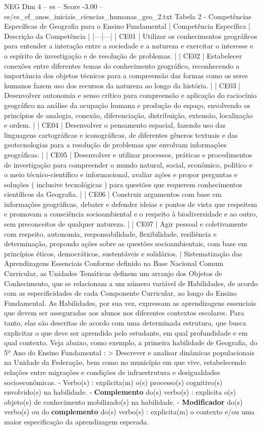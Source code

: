 \begin{textsample}{NEG Dim 4 – es – Score -3.00 – es/es\_ef\_anos\_iniciais\_ciencias\_humanas\_geo\_2.txt}
Tabela 2 - Competências Específicas de Geografia para o Ensino Fundamental | Competência Específica | Descrição da Competência | |---|---| | CE01 | Utilizar os conhecimentos geográficos para entender a interação entre a sociedade e a natureza e exercitar o interesse e o espírito de investigação e de resolução de problemas. | | CE02 | Estabelecer conexões entre diferentes temas do conhecimento geográfico, reconhecendo a importância dos objetos técnicos para a compreensão das formas como os seres humanos fazem uso dos recursos da natureza ao longo da história. | | CE03 | Desenvolver autonomia e senso crítico para compreensão e aplicação do raciocínio geográfico na análise da ocupação humana e produção do espaço, envolvendo os princípios de analogia, conexão, diferenciação, distribuição, extensão, localização e ordem. | | CE04 | Desenvolver o pensamento espacial, fazendo uso das linguagens cartográficas e iconográficas, de diferentes gêneros textuais e das geotecnologias para a resolução de problemas que envolvam informações geográficas. | | CE05 | Desenvolver e utilizar processos, práticas e procedimentos de investigação para compreender o mundo natural, social, econômico, político e o meio técnico-científico e informacional, avaliar ações e propor perguntas e soluções ( inclusive tecnológicas ) para questões que requerem conhecimentos científicos da Geografia. | | CE06 | Construir argumentos com base em informações geográficas, debater e defender ideias e pontos de vista que respeitem e promovam a consciência socioambiental e o respeito à biodiversidade e ao outro, sem preconceitos de qualquer natureza. | | CE07 | Agir pessoal e coletivamente com respeito, autonomia, responsabilidade, flexibilidade, resiliência e determinação, propondo ações sobre as questões socioambientais, com base em princípios éticos, democráticos, sustentáveis e solidários. | Sistematização das Aprendizagens Essenciais Conforme definido na Base Nacional Comum Curricular, as Unidades Temáticas definem um arranjo dos Objetos de Conhecimento, que se relacionam a um número variável de Habilidades, de acordo com as especificidades de cada Componente Curricular, ao longo do Ensino Fundamental.
As Habilidades, por sua vez, expressam as aprendizagens essenciais que devem ser asseguradas aos alunos nos diferentes contextos escolares.
Para tanto, elas são descritas de acordo com uma determinada estrutura, que busca explicitar o que deve ser aprendido pelo estudante, em qual profundidade e em qual contexto.
Veja abaixo, como exemplo, a primeira habilidade de Geografia, do 5º Ano do Ensino Fundamental : > Descrever e analisar dinâmicas populacionais na Unidade da Federação, bem como no município em que vive, estabelecendo relações entre migrações e condições de infraestrutura e desigualdades socioeconômicas. - Verbo(s) : explicita(m) o(s) processo(s) cognitivo(s) envolvido(s) na habilidade. - \textbf{Complemento} do(s) verbo(s) : explicita o(s) objeto(s) de conhecimento mobilizado(s) na habilidade. - \textbf{Modificador} do(s) verbo(s) ou do \textbf{complemento} do(s) verbo(s) : explicita(m) o contexto e/ou uma maior especificação da aprendizagem esperada.

\end{textsample}
